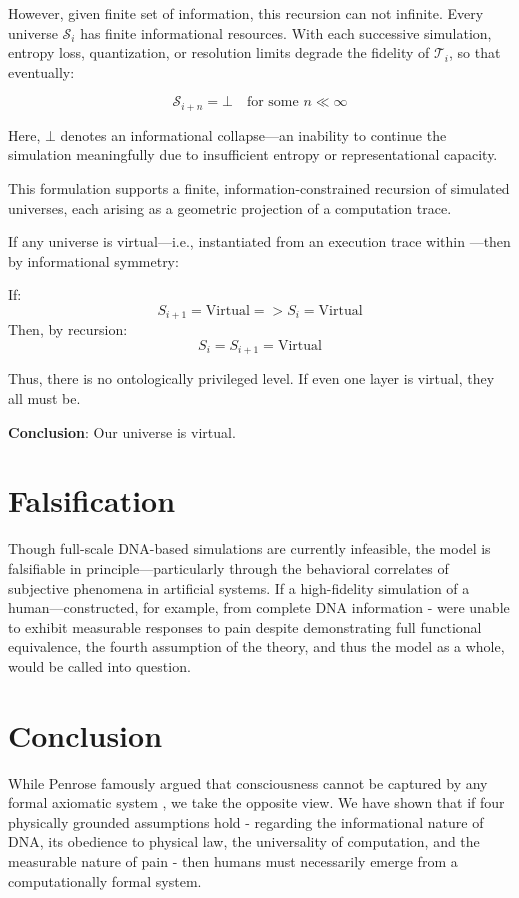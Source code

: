 \documentclass[11pt]{article}
\begin{document}
However, given finite set of information, this recursion can not infinite. Every universe \( \mathcal{S}_i \) has finite informational resources. With each successive simulation, entropy loss, quantization, or resolution limits degrade the fidelity of \( \mathcal{T}_i \), so that eventually:

\[
  \mathcal{S}_{i+n} = \bot \quad \text{for some } n \ll \infty
\]

Here, \( \bot \) denotes an informational collapse—an inability to continue the simulation meaningfully due to insufficient entropy or representational capacity.

This formulation supports a finite, information-constrained recursion of simulated universes, each arising as a geometric projection of a computation trace.

If any universe  is virtual—i.e., instantiated from an execution trace within —then by informational symmetry:

If:
\[
  S_{i+1} = \text{Virtual} => S_{i} = \text{Virtual}
\]
Then, by recursion:
\[
  S_i = S_{i+1} = \text{Virtual}
\]

Thus, there is no ontologically privileged level. If even one layer is virtual, they all must be.

\textbf{Conclusion}: Our universe is virtual.



\section{Falsification}

Though full-scale DNA-based simulations are currently infeasible, the model is falsifiable in principle—particularly through the behavioral correlates of subjective phenomena in artificial systems. If a high-fidelity simulation of a human—constructed, for example,
from complete DNA information - were unable to exhibit measurable responses to pain despite demonstrating full functional
equivalence, the fourth assumption of the theory, and thus the model as a whole, would be called into question.



\section{Conclusion}

While Penrose \cite{penrose1989emperor} famously argued that consciousness cannot be captured by any formal axiomatic system , we take the opposite view. We have shown that if four physically grounded assumptions hold - regarding the informational nature of DNA, its obedience to physical law, the universality of computation, and the measurable nature of pain - then humans must necessarily emerge from a computationally formal system.
\end{document}
